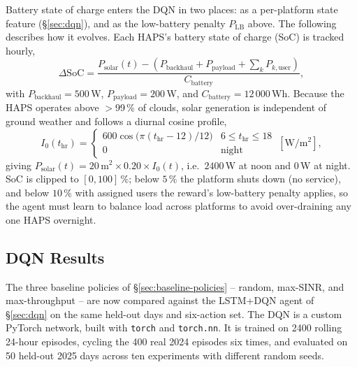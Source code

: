 \documentclass[]{ieeeaccess}
\begin{document}
Battery state of charge enters the DQN in two places: as a per-platform state feature (\S\ref{sec:dqn}), and as the low-battery penalty $P_\mathrm{LB}$ above. The following describes how it evolves. Each HAPS's battery state of charge (SoC) is tracked hourly,
\begin{equation}
\Delta\mathrm{SoC} = \frac{P_\mathrm{solar}(t) - (P_\mathrm{backhaul}+P_\mathrm{payload}+\sum_k P_{k,\mathrm{user}})}{C_\mathrm{battery}},
\label{eq:battery-balance}
\end{equation}
with $P_\mathrm{backhaul}=500$\,W, $P_\mathrm{payload}=200$\,W, and $C_\mathrm{battery}=12\,000$\,Wh. Because the HAPS operates above $>$99\,\% of clouds, solar generation is independent of ground weather and follows a diurnal cosine profile,
\begin{equation}
I_0(t_\mathrm{hr}) = \begin{cases} 600\cos\!\big(\pi(t_\mathrm{hr}-12)/12\big) & 6\le t_\mathrm{hr}\le 18\\ 0 & \text{night}\end{cases}\ [\mathrm{W/m^2}],
\end{equation}
giving $P_\mathrm{solar}(t)=20\,\mathrm{m}^2\times0.20\times I_0(t)$, i.e.\ $2400$\,W at noon and $0$\,W at night. SoC is clipped to $[0,100]\,\%$; below $5\,\%$ the platform shuts down (no service), and below $10\,\%$ with assigned users the reward's low-battery penalty applies, so the agent must learn to balance load across platforms to avoid over-draining any one HAPS overnight.

\subsection{DQN Results}
\label{sec:dqn-results}

The three baseline policies of \S\ref{sec:baseline-policies} -- random, max-SINR, and max-throughput -- are now compared against the LSTM+DQN agent of \S\ref{sec:dqn} on the same held-out days and six-action set. The DQN is a custom PyTorch network, built with \texttt{torch} and \texttt{torch.nn}. It is trained on 2400 rolling 24-hour episodes, cycling the 400 real 2024 episodes six times, and evaluated on 50 held-out 2025 days across ten experiments with different random seeds.
\end{document}
